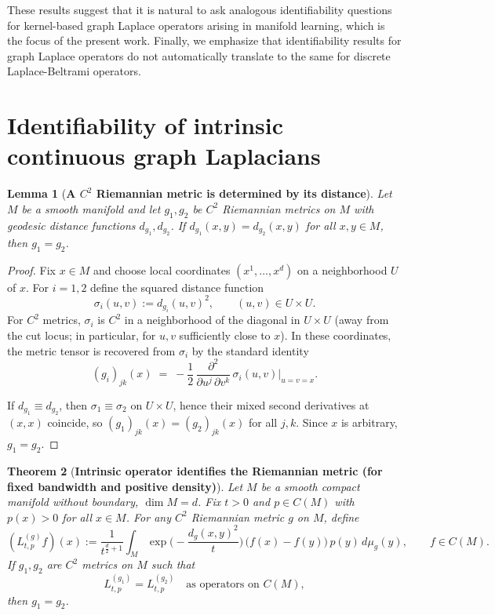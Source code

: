 \documentclass{amsart}
\newtheorem{theorem}{Theorem}[section]
\newtheorem{lemma}[theorem]{Lemma}
\theoremstyle{definition}
\theoremstyle{remark}
\newcommand{\0}{\boldsymbol{0}}
\begin{document}
These results suggest that it is natural to ask analogous identifiability questions for
kernel-based graph Laplace operators arising in manifold learning, which is the focus of the
present work. Finally, we emphasize that identifiability results for graph Laplace operators do not automatically translate to the same for discrete Laplace-Beltrami operators.




\section{Identifiability of intrinsic continuous graph Laplacians}\label{scn:intrinsic-GL}

\begin{lemma}[\textbf{A $C^2$ Riemannian metric is determined by its distance}]
\label{lem:distance_determines_metric}
Let $M$ be a smooth manifold and let $g_1,g_2$ be $C^2$ Riemannian metrics on $M$ with
geodesic distance functions $d_{g_1},d_{g_2}$. If $d_{g_1}(x,y)=d_{g_2}(x,y)$ for all
$x,y\in M$, then $g_1=g_2$.
\end{lemma}

\begin{proof}
Fix $x\in M$ and choose local coordinates $(x^1,\dots,x^d)$ on a neighborhood $U$ of $x$.
For $i=1,2$ define the squared distance function
\[
\sigma_i(u,v):=d_{g_i}(u,v)^2,\qquad (u,v)\in U\times U.
\]
For $C^2$ metrics, $\sigma_i$ is $C^2$ in a neighborhood of the diagonal in $U\times U$
(away from the cut locus; in particular, for $u,v$ sufficiently close to $x$).
In these coordinates, the metric tensor is recovered from $\sigma_i$ by the standard identity
\[
(g_i)_{jk}(x)\;=\;-\frac{1}{2}\,\frac{\partial^2}{\partial u^j\,\partial v^k}\,\sigma_i(u,v)\Big|_{u=v=x}.
\]

If $d_{g_1}\equiv d_{g_2}$, then $\sigma_1\equiv \sigma_2$ on $U\times U$, hence their mixed
second derivatives at $(x,x)$ coincide, so $(g_1)_{jk}(x)=(g_2)_{jk}(x)$ for all $j,k$.
Since $x$ is arbitrary, $g_1=g_2$.
\end{proof}


\begin{theorem}[\textbf{Intrinsic operator identifies the Riemannian metric (for fixed bandwidth and positive density)}]
\label{thm:intrinsic_metric_identifiable}
Let $M$ be a smooth compact manifold without boundary, $\dim M=d$.
Fix $t>0$ and $p\in C(M)$ with $p(x)>0$ for all $x\in M$.
For any $C^2$ Riemannian metric $g$ on $M$, define
\[
(L^{(g)}_{t,p} f)(x)
:=\frac{1}{t^{\frac d2+1}}\int_M \exp\!\Big(-\frac{d_g(x,y)^2}{t}\Big)\,\bigl(f(x)-f(y)\bigr)\,p(y)\,d\mu_g(y),
\qquad f\in C(M).
\]
If $g_1,g_2$ are $C^2$ metrics on $M$ such that
\[
L^{(g_1)}_{t,p}=L^{(g_2)}_{t,p}\quad\text{as operators on }C(M),
\]
then $g_1=g_2$.
\end{theorem}
\end{document}
